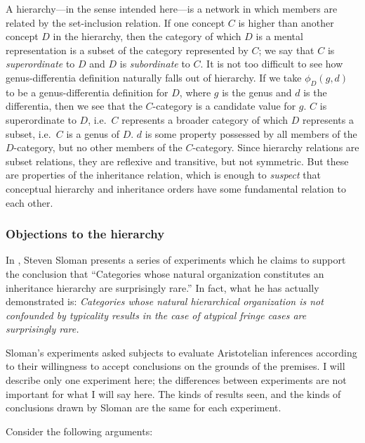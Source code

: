 A hierarchy---in the sense intended here---is a network in which members are related by the set-inclusion relation. If one concept $C$ is higher than another concept $D$ in the hierarchy, then the category of which $D$ is a mental representation is a subset of the category represented by $C$; we say that $C$ is \emph{superordinate} to $D$ and $D$ is \emph{subordinate} to $C$. It is not too difficult to see how genus-differentia definition naturally falls out of hierarchy. If we take $\phi_D(g,d)$ to be a genus-differentia definition for $D$, where $g$ is the genus and $d$ is the differentia, then we see that the $C$-category is a candidate value for $g$. $C$ is superordinate to $D$, i.e.\ $C$ represents a broader category of which $D$ represents a subset, i.e.\ $C$ is a genus of $D$. $d$ is some property possessed by all members of the $D$-category, but no other members of the $C$-category. Since hierarchy relations are subset relations, they are reflexive and transitive, but not symmetric. But these are properties of the inheritance relation, which is enough to \emph{suspect} that conceptual hierarchy and inheritance orders have some fundamental relation to each other.

\subsubsection{Objections to the hierarchy}

In \cite{sloman_categorical_1998}, Steven Sloman presents a series of experiments which he claims to support the conclusion that ``Categories whose natural organization constitutes an inheritance hierarchy are surprisingly rare.'' In fact, what he has actually demonstrated is: \emph{Categories whose natural hierarchical organization is not confounded by typicality results in the case of atypical fringe cases are surprisingly rare.}

Sloman's experiments asked subjects to evaluate Aristotelian inferences according to their willingness to accept conclusions on the grounds of the premises. I will describe only one experiment here; the differences between experiments are not important for what I will say here. The kinds of results seen, and the kinds of conclusions drawn by Sloman are the same for each experiment.

Consider the following arguments:
\begin{prooftree}
\end{prooftree}
\par\vspace{3mm}
\begin{prooftree}
\end{prooftree}

